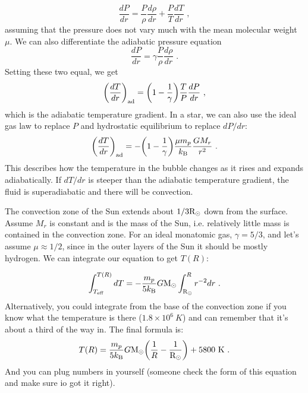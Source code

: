 \begin{enumerate}
	\begin{equation}
	\frac{dP}{dr} = \frac{P}{\rho} \frac{d \rho}{dr} + \frac{P}{T} \frac{d T}{dr} \,\, ,
	\end{equation}
	assuming that the pressure does not vary much with the mean molecular weight $\mu$. We can also differentiate the adiabatic pressure equation
	\begin{equation}
	\frac{dP}{dr} = \gamma \frac{P}{\rho}\frac{d\rho}{dr}\,\, .
	\end{equation}
	Setting these two equal, we get
	\begin{equation}
	\biggl(\frac{dT}{dr}\biggr)_{\rm ad} = \biggl(1 - \frac{1}{\gamma}\biggr)\frac{T}{P} \frac{dP}{dr}\,\, ,
	\end{equation}
	which is the adiabatic temperature gradient. In a star, we can also use the ideal gas law to replace $P$ and hydrostatic equilibrium to replace $dP/dr$:
	\begin{equation}
	\biggl(\frac{dT}{dr}\biggr)_{\rm ad} = -\biggl(1 - \frac{1}{\gamma}\biggr)\frac{\mu m_p}{k_{\rm B}} \frac{G M_r}{r^2}\,\, .
	\end{equation}
	This describes how the temperature in the bubble changes as it rises and expands adiabatically. If $dT/dr$ is steeper than the adiabatic temperature gradient, the fluid is superadiabatic and there will be convection.
	
	The convection zone of the Sun extends about $1/3 {\rm R}_\odot$ down from the surface. Assume $M_r$ is constant and is the mass of the Sun, i.e. relatively little mass is contained in the convection zone. For an ideal monatomic gas, $\gamma = 5/3$, and let's assume $\mu \approx 1/2$, since in the outer layers of the Sun it should be mostly hydrogen. We can integrate our equation to get $T(R)$:
	
	\begin{equation}
	\int^{T(R)}_{T_{\rm eff}} dT = -\frac{m_p}{5 k_{\rm B}} G {\rm M}_\odot \int^R_{\rm R_\odot} r^{-2}dr \,\, .
	\end{equation}
	Alternatively, you could integrate from the base of the convection zone if you know what the temperature is there ($1.8 \times 10^6~K$) and can remember that it's about a third of the way in. The final formula is:
	\begin{equation}
	T(R) = \frac{m_p}{5 k_{\rm B}} G {\rm M}_\odot \biggl( \frac{1}{R} - \frac{1}{{\rm R}_\odot}\biggr) + 5800~{\rm K}\,\, .
	\end{equation}
	And you can plug numbers in yourself (someone check the form of this equation and make sure io got it right).
	

\end{enumerate}
